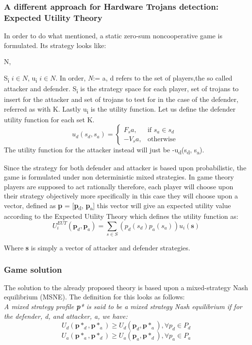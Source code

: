 \documentclass[conference]{IEEEtran}
\begin{document}
\subsubsection{A different approach for Hardware Trojans detection: Expected Utility Theory}
In order to do what mentioned, a static zero-sum noncooperative game is formulated. Its strategy looks like: {N, {S\textsubscript{i} $i\in N$, {u\textsubscript{i} $i\in N$}. In order, \textit{N}:= {a, d} refers to the set of players,the so called attacker and defender. S\textsubscript{i} is the strategy space for each player, set of trojans to insert for the attacker and set of trojans to test for in the case of the defender, referred as with K. Lastly u\textsubscript{i} is the utility function.
Let us define the defender utility function for each set K.
\begin{displaymath}
u_d(s_d, s_a) = \begin{cases} F_sa, & \mbox{if } s_a\in s_d \\ -V_sa, & \mbox{otherwise } \end{cases}
\end{displaymath}
The utility function for the attacker instead will just be -u\textsubscript{d}(s\textsubscript{d}, s\textsubscript{a}).

Since the strategy for both defender and attacker is based upon probabilistic, the game is formulated under non deterministic mixed strategies.
In game theory players are supposed to act rationally therefore, each player will choose upon their strategy objectively more specifically in this case they will choose upon a vector, defined as \textbf{p} = [\textbf{p}\textsubscript{d}, \textbf{p}\textsubscript{a}] this vector will give an expected utility value according to the Expected Utility Theory which defines the utility function as: 
\begin{displaymath}
U_i^{EUT}(\textbf{p}_d, \textbf{p}_a) = \sum_{s\in S} (p_d(s_d)p_a(s_a)) u_i(\textbf{s})
\end{displaymath}

Where \textbf{s} is simply a vector of attacker and defender strategies.

\subsubsection{Game solution}
The solution to the already proposed theory is based upon a mixed-strategy Nash equilibrium (MSNE). The definition for this looks as follows:\\
\textit{A mixed strategy profile \textbf{p}* is said to be a mixed
strategy Nash equilibrium if for the defender, d, and attacker, a,
we have:}
\begin{displaymath}
U_d(\textbf{p}*_d,\textbf{p}*_a) \geq U_d(\textbf{p}_d,\textbf{p}*_a), \forall p_d\in P_d 
\end{displaymath}
\begin{displaymath}
U_a(\textbf{p}*_a,\textbf{p}*_d) \geq U_a(\textbf{p}_a,\textbf{p}*_d), \forall p_a\in P_a
\end{displaymath}

}}
\end{document}
